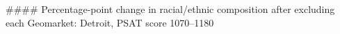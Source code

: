 #### Percentage-point change in racial/ethnic composition after excluding each Geomarket: Detroit, PSAT score 1070–1180
